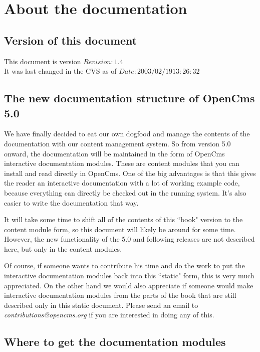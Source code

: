\chapter{About the documentation}
\label{About the documentation}

\section{Version of this document}

This document is version $Revision: 1.4 $ \\
It was last changed in the CVS as of $Date: 2003/02/19 13:26:32 $ \\

\section{The new documentation structure of OpenCms 5.0}

We have finally decided to eat our own dogfood and manage the contents of the documentation 
with our content management system.
So from version 5.0 onward, the documentation will be maintained in the form of OpenCms 
interactive documentation modules.
These are content modules that you can install and read directly in OpenCms.
One of the big advantages is that this gives the reader an interactive documentation 
with a lot of working example code,
because everything can directly be checked out in the running system.
It's also easier to write the documentation that way.

It will take some time to shift all of the contents of this ``book" version to 
the content module form, so this document will likely be around for some time.
However, the new functionality of the 5.0 and following releases are not described here,
but only in the content modules.

Of course, if someone wants to contribute his time and do the work to 
put the interactive documentation modules back into this ``static" form, this is very much appreciated. 
On the other hand we would also appreciate if someone would make interactive documentation modules
from the parts of the book that are still described only in this static document.
Please send an email to {\em contributions@opencms.org} if you are interested in doing any of this.

\section{Where to get the documentation modules}

